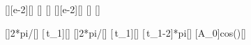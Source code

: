 [\cm][e-2][\meter]
[\second]
[\second]
[\cm][e-2][\meter]
[\second]
[\second]

[]{2*pi/\TaX}[\per\second]
[\omega\,t_1]{\waX*\tcaX}[\radian]
[]{2*pi/\TbX}[\per\second]
[\omega\,t_1]{\wbX*\tcbX}[\radian]
[\omega\,t_1-2\pi]{*pi}[\radian]
[A\cos\varphi_0]{\AbX*cos(\phbX)}[\meter]
